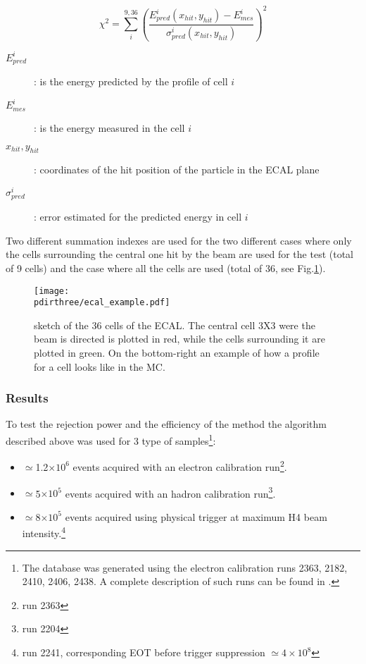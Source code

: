 \begin{equation}
  \chi^2 = \sum^{9,36}_i \left(\frac{E_{pred}^i(x_{hit},y_{hit})-E_{mes}^i}{\sigma^{i}_{pred}(x_{hit},y_{hit})}\right)^2
  \label{eqn:chi}
\end{equation}


\begin{description}
\item[$E_{pred}^i$]: is the energy predicted by the profile of cell
  $i$
\item[$E_{mes}^i$]: is the energy measured in the cell $i$
\item[$x_{hit},y_{hit}$]: coordinates of the hit position of the
  particle in the ECAL plane
\item [$\sigma^{i}_{pred}$]: error estimated for the predicted energy
  in cell $i$
\end{description}


Two different summation indexes are used for the two different cases
where only the cells surrounding the central one hit by the beam are
used for the test (total of 9 cells) and the case where all the cells
are used (total of 36, see Fig.\ref{fig:ecal_example}).

\begin{figure}[h!]
  \begin{center}
    \texttt{[image: \\pdirthree/ecal\_example.pdf]}
  \end{center}
  \caption[ECAL sketch]{sketch of the 36 cells of the ECAL. The central cell 3X3
    were the beam is directed is plotted in red, while the cells
    surrounding it are plotted in green. On the bottom-right an
    example of how a profile for a cell looks like in the MC.}
  \label{fig:ecal_example}
\end{figure}

\subsubsection{Results}
\label{ch3:sec:chi2-result}

To test the rejection power and the efficiency of the
method the algorithm described above was used for 3 type of samples\footnote{The database was generated using the electron  calibration runs 2363, 2182, 2410, 2406, 2438. A complete description of such runs can be found in \cite{na64-runs}. }:
\begin{itemize}
\item $\simeq$1.2$\times 10^{6}$ events acquired with an electron calibration run\footnote{run 2363}.
\item $\simeq$5$\times 10^{5}$ events acquired with an hadron calibration run\footnote{run 2204}.
\item $\simeq$8$\times 10^{5}$ events acquired using physical trigger at maximum H4 beam intensity.\footnote{run 2241, corresponding EOT before trigger suppression $\simeq 4 \times 10^{8}$}
\end{itemize}

